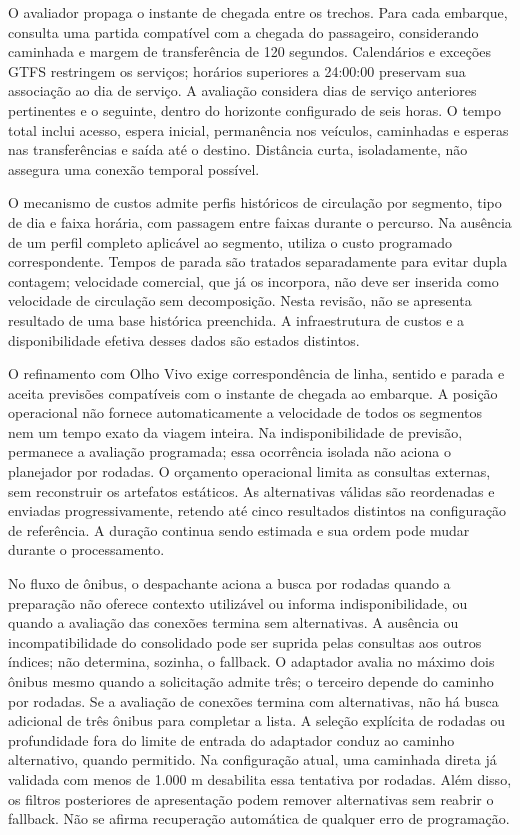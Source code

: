 O avaliador propaga o instante de chegada entre os trechos. Para cada embarque, consulta uma partida compatível com a chegada do passageiro, considerando caminhada e margem de transferência de 120 segundos. Calendários e exceções GTFS restringem os serviços; horários superiores a 24:00:00 preservam sua associação ao dia de serviço. A avaliação considera dias de serviço anteriores pertinentes e o seguinte, dentro do horizonte configurado de seis horas. O tempo total inclui acesso, espera inicial, permanência nos veículos, caminhadas e esperas nas transferências e saída até o destino. Distância curta, isoladamente, não assegura uma conexão temporal possível.

O mecanismo de custos admite perfis históricos de circulação por segmento, tipo de dia e faixa horária, com passagem entre faixas durante o percurso. Na ausência de um perfil completo aplicável ao segmento, utiliza o custo programado correspondente. Tempos de parada são tratados separadamente para evitar dupla contagem; velocidade comercial, que já os incorpora, não deve ser inserida como velocidade de circulação sem decomposição. Nesta revisão, não se apresenta resultado de uma base histórica preenchida. A infraestrutura de custos e a disponibilidade efetiva desses dados são estados distintos.

O refinamento com Olho Vivo exige correspondência de linha, sentido e parada e aceita previsões compatíveis com o instante de chegada ao embarque. A posição operacional não fornece automaticamente a velocidade de todos os segmentos nem um tempo exato da viagem inteira. Na indisponibilidade de previsão, permanece a avaliação programada; essa ocorrência isolada não aciona o planejador por rodadas. O orçamento operacional limita as consultas externas, sem reconstruir os artefatos estáticos. As alternativas válidas são reordenadas e enviadas progressivamente, retendo até cinco resultados distintos na configuração de referência. A duração continua sendo estimada e sua ordem pode mudar durante o processamento.

No fluxo de ônibus, o despachante aciona a busca por rodadas quando a preparação não oferece contexto utilizável ou informa indisponibilidade, ou quando a avaliação das conexões termina sem alternativas. A ausência ou incompatibilidade do consolidado pode ser suprida pelas consultas aos outros índices; não determina, sozinha, o fallback. O adaptador avalia no máximo dois ônibus mesmo quando a solicitação admite três; o terceiro depende do caminho por rodadas. Se a avaliação de conexões termina com alternativas, não há busca adicional de três ônibus para completar a lista. A seleção explícita de rodadas ou profundidade fora do limite de entrada do adaptador conduz ao caminho alternativo, quando permitido. Na configuração atual, uma caminhada direta já validada com menos de 1.000 m desabilita essa tentativa por rodadas. Além disso, os filtros posteriores de apresentação podem remover alternativas sem reabrir o fallback. Não se afirma recuperação automática de qualquer erro de programação.

